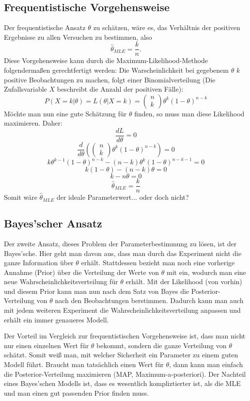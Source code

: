 \documentclass{article}
\begin{document}
\subsection{Frequentistische Vorgehensweise}
Der frequentistische Ansatz \(\theta\) zu schätzen, wäre es, das Verhältnis der positiven Ergebnisse zu allen Versuchen zu bestimmen, also\[
\hat\theta_{MLE}=\frac kn.
\]Diese Vorgehensweise kann durch die Maximum-Likelihood-Methode folgendermaßen gerechtfertigt werden: Die Warscheinlichkeit bei gegebenem \(\theta\) \(k\) positive Beobachtungen zu machen, folgt einer Binomialverteilung (Die Zufallsvariable \(X\) beschreibt die Anzahl der positiven Fälle):\[
    P(X=k|\theta)=L(\theta|X=k)=\begin{pmatrix}
        n\\k
    \end{pmatrix}\theta^k(1-\theta)^{n-k}
\]Möchte man nun eine gute Schätzung für \(\theta\) finden, so muss man diese Likelihood maximieren. Daher:
\[
\frac{dL}{d\theta}=0
\]\[
    \frac{d}{d\theta}(\begin{pmatrix}
        n\\k
    \end{pmatrix}\theta^k(1-\theta)^{n-k})=0
\]\[
    k\theta^{k-1}(1-\theta)^{n-k}-(n-k)\theta^k(1-\theta)^{n-k-1}=0
\]\[
    k(1-\theta)-(n-k)\theta=0
\]\[
    k-n\theta=0
\]\[
    \hat\theta_{MLE}=\frac{k}{n}
\]Somit wäre \(\hat\theta_{MLE}\) der ideale Parameterwert... oder doch nicht?

\subsection{Bayes'scher Ansatz}
Der zweite Ansatz, dieses Problem der Parameterbestimmung zu lösen, ist der Bayes'sche. Hier geht man davon aus, dass man durch das Experiment nicht die ganze Information über \(\theta\) erhält. Stattdessen bezieht man noch eine vorherige Annahme (Prior) über die Verteilung der Werte von \(\theta\) mit ein, wodurch man eine neue Wahrscheinlichkeitsverteilung für \(\theta\) erhält. Mit der Likelihood (von vorhin) und diesem Prior kann man nun nach dem Satz von Bayes die Posterior-Verteilung von \(\theta\) nach den Beobachtungen berstimmen. Dadurch kann man auch mit jedem weiteren Experiment die Wahrscheinlichkeitsverteilung anpassen und erhält ein immer genaueres Modell. 

Der Vorteil im Vergleich zur frequentistischen Vorgehensweise ist, dass man nicht nur einen einzelnen Wert für \(\theta\) bekommt, sondern die ganze Verteilung von \(\theta\) schätzt. Somit weiß man, mit welcher Sicherheit ein Parameter zu einem guten Modell führt. Braucht man tatsächlich einen Wert für \(\theta\), dann kann man einfach die Posterior-Verteilung maximieren (MAP, Maximum-a-posteriori). Der Nachteil eines Bayes'schen Modells ist, dass es wesentlich kompliztierter ist, als die MLE und man einen gut passenden Prior finden muss.
\end{document}
